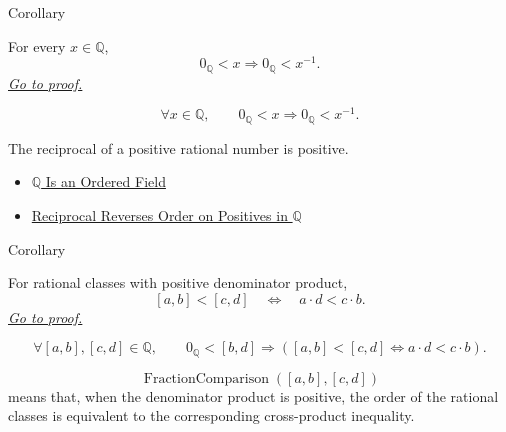 \begin{corollarybox}{Corollary}
\begin{corollary}
\label{cor:positive-rationals-have-positive-inverses}
For every $x\in\mathbb{Q}$,
\[
0_{\mathbb{Q}}<x
\Longrightarrow
0_{\mathbb{Q}}
<x^{-1}.
\]
\hyperref[prf:positive-rationals-have-positive-inverses]{\textit{Go to proof.}}
\end{corollary}
\end{corollarybox}

\begin{remark*}
\[
\forall x\in\mathbb{Q},\qquad
0_{\mathbb{Q}}<x\Longrightarrow 0_{\mathbb{Q}}<x^{-1}.
\]
\end{remark*}

\begin{remark*}[Interpretation]
The reciprocal of a positive rational number is positive.
\end{remark*}

\begin{dependencies}
\begin{itemize}
  \item \hyperref[thm:q-is-an-ordered-field]{$\mathbb{Q}$ Is an Ordered Field}
  \item \hyperref[thm:reciprocal-reverses-order-on-positives-q]{Reciprocal Reverses Order on Positives in $\mathbb{Q}$}
\end{itemize}
\end{dependencies}

\begin{corollarybox}{Corollary}
\begin{corollary}
\label{cor:fraction-comparison-on-q}
For rational classes with positive denominator product,
\[
[a,b]<[c,d]
\quad\Longleftrightarrow\quad
a\cdot d<c\cdot b.
\]
\hyperref[prf:fraction-comparison-on-q]{\textit{Go to proof.}}
\end{corollary}
\end{corollarybox}

\begin{remark*}
\[
\forall [a,b],[c,d]\in\mathbb{Q},\qquad
0_{\mathbb{Q}}<[b,d]
\Longrightarrow
\left([a,b]<[c,d]\Longleftrightarrow a\cdot d<c\cdot b\right).
\]
\end{remark*}

\begin{remark*}
\[
\operatorname{FractionComparison}([a,b],[c,d])
\]
means that, when the denominator product is positive, the order of the rational classes is equivalent to the corresponding cross-product inequality.
\end{remark*}

